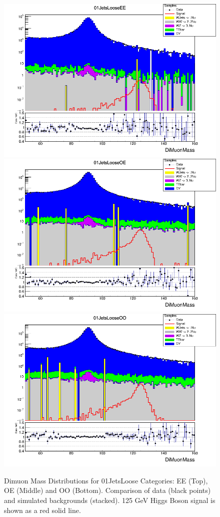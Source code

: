 \begin{figure}[htbp]
  \centering
  \includegraphics[width=0.65\linewidth]{figures/ch_higgs/distributions/baseline_kalman/distribution__01JetsLooseEE__DiMuonMass__logY.png}\\
  \includegraphics[width=0.65\linewidth]{figures/ch_higgs/distributions/baseline_kalman/distribution__01JetsLooseOE__DiMuonMass__logY.png}\\
  \includegraphics[width=0.65\linewidth]{figures/ch_higgs/distributions/baseline_kalman/distribution__01JetsLooseOO__DiMuonMass__logY.png}
  \caption{Dimuon Mass Distributions for 01JetsLoose Categories: EE (Top), OE (Middle) and OO (Bottom). Comparison of data (black points) and simulated backgrounds (stacked). 125 GeV Higgs Boson signal is shown as a red solid line.}
  \label{fig:higgs_categorization_01jetslooseeeeooo}
\end{figure}

